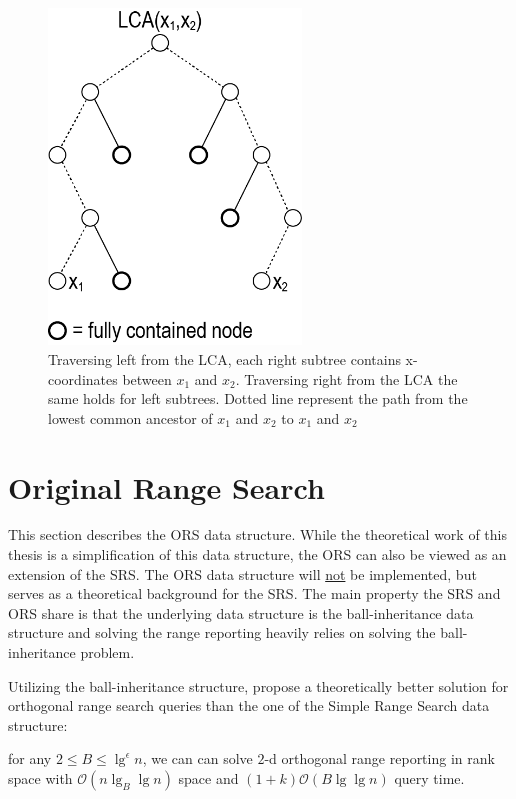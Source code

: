 \begin{figure}[h]
    \centering
    \includegraphics[width=0.6\textwidth]{pictures/LCA2.png}
    \caption{Traversing left from the LCA, each right subtree contains x-coordinates between $x_1$ and $x_2$. Traversing right from the LCA the same holds for left subtrees. Dotted line represent the path from the lowest common ancestor of $x_1$ and $x_2$ to $x_1$ and $x_2$}
    \label{fig:LCA}
\end{figure}


\section{Original Range Search}
\label{sect:original}

This section describes the ORS data structure. While the theoretical work of this thesis is a simplification of this data structure, the ORS can also be viewed as an extension of the SRS. The ORS data structure will \underline{not} be implemented, but serves as a theoretical background for the SRS. The main property the SRS and ORS share is that the underlying data structure is the ball-inheritance data structure and solving the range reporting heavily relies on solving the ball-inheritance problem.

Utilizing the ball-inheritance structure, \citet{chanetal} propose a theoretically better solution for orthogonal range search queries than the one of the Simple Range Search data structure: 
\begin{customthm}{2.1}\label{theorem21}
for any $2 \leq B \leq \lg^\epsilon n$, we can can solve $2$-d orthogonal range reporting in rank space with $\mathcal{O}(n \lg_B \lg n)$ space and $(1+k)\mathcal{O}(B \lg \lg n)$ query time.
\end{customthm}

